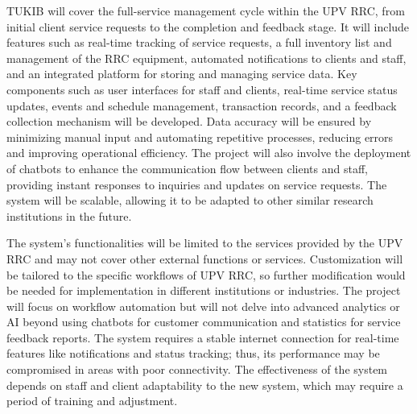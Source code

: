 TUKIB will cover the full-service management cycle within the UPV RRC, from initial client service requests to the completion and feedback stage. It will include features such as real-time tracking of service requests, a full inventory list and management of the RRC equipment, automated notifications to clients and staff, and an integrated platform for storing and managing service data. Key components such as user interfaces for staff and clients, real-time service status updates, events and schedule management, transaction records,  and a feedback collection mechanism will be developed. Data accuracy will be ensured by minimizing manual input and automating repetitive processes, reducing errors and improving operational efficiency. The project will also involve the deployment of chatbots to enhance the communication flow between clients and staff, providing instant responses to inquiries and updates on service requests. The system will be scalable, allowing it to be adapted to other similar research institutions in the future.

The system’s functionalities will be limited to the services provided by the UPV RRC and may not cover other external functions or services. Customization will be tailored to the specific workflows of UPV RRC, so further modification would be needed for implementation in different institutions or industries. The project will focus on workflow automation but will not delve into advanced analytics or AI beyond using chatbots for customer communication and statistics for service feedback reports. The system requires a stable internet connection for real-time features like notifications and status tracking; thus, its performance may be compromised in areas with poor connectivity. The effectiveness of the system depends on staff and client adaptability to the new system, which may require a period of training and adjustment.


\begin{comment}

%
%
Generally, one paragraph should be allotted for each of your research objectives.

Each paragraph contains a brief overview of the concept/theory and the purpose of doing the associated objective.

Each paragraph also includes a description of the scope/limitation of your study.

* Please refer to the slides for examples.

\end{comment}


